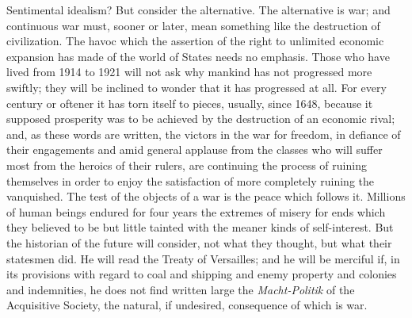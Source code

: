 \documentclass{book}
\begin{document}
Sentimental idealism? But consider the alternative. The alternative is war; and continuous war must, sooner or later, mean something like the destruction of civilization. The havoc which the assertion of the right to unlimited economic expansion has made of the world of States needs no emphasis. Those who have lived from 1914 to 1921 will not ask why mankind has not progressed more swiftly; they will be inclined to wonder that it has progressed at all. For every century or oftener it has torn itself to pieces, usually, since 1648, because it supposed prosperity was to be achieved by the destruction of an economic rival; and, as these words are written, the victors in the war for freedom, in defiance of their engagements and amid general applause from the classes who will suffer most from the heroics of their rulers, are continuing the process of ruining themselves in order to enjoy the satisfaction of more completely ruining the vanquished. The test of the objects of a war is the peace which follows it. Millions of human beings endured for four years the extremes of misery for ends which they believed to be but little tainted with the meaner kinds of self-interest. But the historian of the future will consider, not what they thought, but what their statesmen did. He will read the Treaty of Versailles; and he will be merciful if, in its provisions with regard to coal and shipping and enemy property and colonies and indemnities, he does not find written large the \emph{Macht-Politik} of the Acquisitive Society, the natural, if undesired, consequence of which is war.
\end{document}
